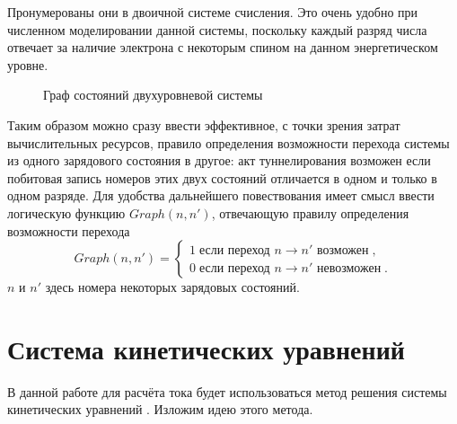 \documentclass[12pt,a4paper]{report}
\begin{document}
Пронумерованы они в двоичной системе счисления. Это очень удобно при численном моделировании данной системы, поскольку каждый разряд числа отвечает за наличие электрона с некоторым спином на данном энергетическом уровне.

\begin{figure}[h]
	\caption{Граф состояний двухуровневой системы}
	\label{fig:level-graph1}
\end{figure}

Таким образом можно сразу ввести эффективное, с точки зрения затрат вычислительных ресурсов, правило определения возможности перехода системы из одного зарядового состояния в другое: акт туннелирования возможен если побитовая запись номеров этих двух состояний отличается в одном и только в одном разряде. Для удобства дальнейшего повествования имеет смысл ввести логическую функцию $Graph(n, n')$, отвечающую правилу определения возможности перехода
\begin{equation}\label{rule}
Graph(n, n') =  \left\{
  \begin{array}{c}
    1\;\mbox{если переход $n \to n'$ возможен}\;,\\
    0\;\mbox{если переход $n \to n'$ невозможен}\;.
  \end{array}
  \right.
\end{equation}
$n$ и $n'$ здесь номера некоторых зарядовых состояний. 

\section{Система кинетических уравнений}
В данной работе для расчёта тока будет использоваться метод решения системы кинетических уравнений \cite{kinetic}. Изложим идею этого метода.
\end{document}
